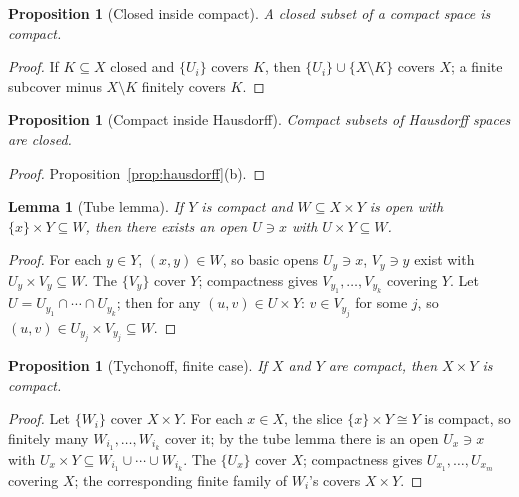 \documentclass[11pt,a4paper]{article}
\newtheorem{lemma}[theorem]{Lemma}
\newtheorem{proposition}[theorem]{Proposition}
\theoremstyle{definition}
\begin{document}
	\begin{proposition}[Closed inside compact]\label{prop:closed-in-compact}
		A closed subset of a compact space is compact.
	\end{proposition}
	\begin{proof}
		If $K\subseteq X$ closed and $\{U_i\}$ covers $K$, then $\{U_i\}\cup\{X\setminus K\}$ covers $X$; a finite subcover minus $X\setminus K$ finitely covers $K$.
	\end{proof}
	
	\begin{proposition}[Compact inside Hausdorff]\label{prop:compact-in-hausdorff}
		Compact subsets of Hausdorff spaces are closed.
	\end{proposition}
	\begin{proof}
		Proposition~\ref{prop:hausdorff}(b).
	\end{proof}
	
	\begin{lemma}[Tube lemma]\label{lem:tube}
		If $Y$ is compact and $W\subseteq X\times Y$ is open with $\{x\}\times Y\subseteq W$, then there exists an open $U\ni x$ with $U\times Y\subseteq W$.
	\end{lemma}
	\begin{proof}
		For each $y\in Y$, $(x,y)\in W$, so basic opens $U_y\ni x$, $V_y\ni y$ exist with $U_y\times V_y\subseteq W$.
		The $\{V_y\}$ cover $Y$; compactness gives $V_{y_1},\dots,V_{y_k}$ covering $Y$. Let
		$U=U_{y_1}\cap\cdots\cap U_{y_k}$; then for any $(u,v)\in U\times Y$: $v\in V_{y_j}$ for some $j$, so
		$(u,v)\in U_{y_j}\times V_{y_j}\subseteq W$.
	\end{proof}
	
	\begin{proposition}[Tychonoff, finite case]\label{prop:tychonoff-finite}
		If $X$ and $Y$ are compact, then $X\times Y$ is compact.
	\end{proposition}
	\begin{proof}
		Let $\{W_i\}$ cover $X\times Y$. For each $x\in X$, the slice $\{x\}\times Y\cong Y$ is compact, so finitely
		many $W_{i_1},\dots,W_{i_k}$ cover it; by the tube lemma there is an open $U_x\ni x$ with
		$U_x\times Y\subseteq W_{i_1}\cup\cdots\cup W_{i_k}$. The $\{U_x\}$ cover $X$; compactness gives
		$U_{x_1},\dots,U_{x_m}$ covering $X$; the corresponding finite family of $W_i$'s covers $X\times Y$.
	\end{proof}
	
\end{document}
